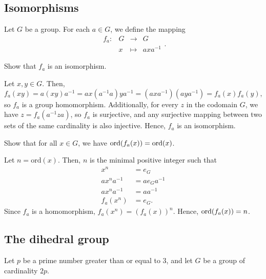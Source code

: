 \subsection*{Isomorphisms}

Let $ G $ be a group. For each $ a\in G $, we define the mapping
\begin{equation*}
    \begin{array}{rrcl}
        f_a: & G & \to & G \\
        & x & \mapsto & axa^{-1} 
    \end{array}.
\end{equation*}

\begin{exer}
Show that $ f_a $ is an isomorphism.
\end{exer}
\begin{sltn}
Let $ x,y\in G $. Then,
\begin{equation*}
    f_a(xy)=a(xy)a^{-1}=ax(a^{-1}a)ya^{-1}=(axa^{-1})(aya^{-1})=f_a(x)f_a(y),
\end{equation*}
so $ f_a $ is a group homomorphism. Additionally, for every $ z $ in the codomain $ G $, we have $ z=f_a(a^{-1}za) $, so $ f_a $ is surjective, and any surjective mapping between two sets of the same cardinality is also injective. Hence, $ f_a $ is an isomorphism.
\end{sltn}

\begin{exer}
Show that for all $ x\in G $, we have $ \operatorname{ord}(f_a(x))=\operatorname{ord}(x) $.
\end{exer}
\begin{sltn}
Let $ n=\mathrm{ord}(x) $. Then, $ n $ is the minimal positive integer such that
\begin{align*}
    x^n &= e_G \\
    ax^na^{-1} &= ae_Ga^{-1} \\
    ax^na^{-1} &= aa^{-1} \\
    f_a(x^n) &= e_G.
\end{align*}
Since $ f_a $ is a homomorphism, $ f_a(x^n)=(f_a(x))^n $. Hence, $ \operatorname{ord}(f_a(x))=n $.
\end{sltn}

\subsection*{The dihedral group}

Let $ p $ be a prime number greater than or equal to $ 3 $, and let $ G $ be a group of cardinality $ 2p $.

